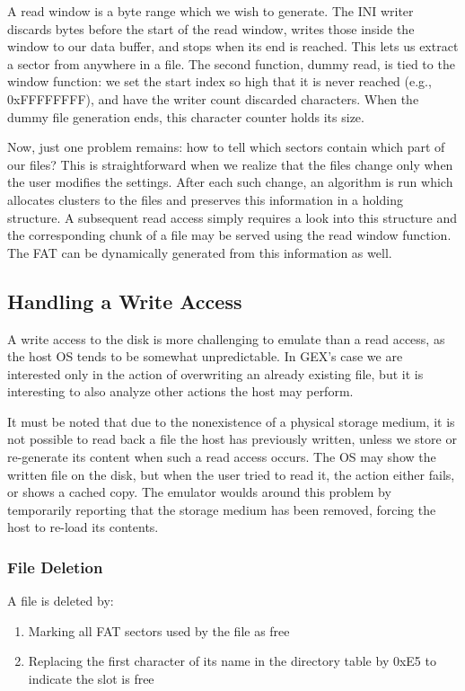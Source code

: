 A read window is a byte range which we wish to generate. The INI writer discards bytes before the start of the read window, writes those inside the window to our data buffer, and stops when its end is reached. This lets us extract a sector from anywhere in a file. The second function, dummy read, is tied to the window function: we set the start index so high that it is never reached (e.g., 0xFFFFFFFF), and have the writer count discarded characters. When the dummy file generation ends, this character counter holds its size.

Now, just one problem remains: how to tell which sectors contain which part of our files? This is straightforward when we realize that the files change only when the user modifies the settings. After each such change, an algorithm is run which allocates clusters to the files and preserves this information in a holding structure. A subsequent read access simply requires a look into this structure and the corresponding chunk of a file may be served using the read window function. The \gls{FAT} can be dynamically generated from this information as well.

\subsection{Handling a Write Access}

A write access to the disk is more challenging to emulate than a read access, as the host OS tends to be somewhat unpredictable. In GEX's case we are interested only in the action of overwriting an already existing file, but it is interesting to also analyze other actions the host may perform.

It must be noted that due to the nonexistence of a physical storage medium, it is not possible to read back a file the host has previously written, unless we store or re-generate its content when such a read access occurs. The \gls{OS} may show the written file on the disk, but when the user tried to read it, the action either fails, or shows a cached copy. The emulator woulds around this problem by temporarily reporting that the storage medium has been removed, forcing the host to re-load its contents.

\subsubsection{File Deletion}

A file is deleted by:

\begin{enumerate}
	\item Marking all \gls{FAT} sectors used by the file as free
	\item Replacing the first character of its name in the directory table by 0xE5 to indicate the slot is free
\end{enumerate}

